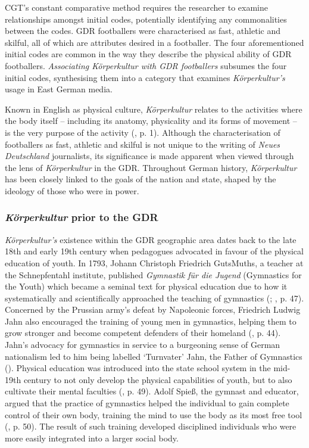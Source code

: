 CGT’s constant comparative method requires the researcher to examine relationships amongst initial codes, potentially identifying any commonalities between the codes. GDR footballers were characterised as fast, athletic and skilful, all of which are attributes desired in a footballer. The four aforementioned initial codes are common in the way they describe the physical ability of GDR footballers. \textit{Associating Körperkultur with GDR footballers} subsumes the four initial codes, synthesising them into a category that examines \textit{Körperkultur’s} usage in East German media.

Known in English as physical culture, \textit{Körperkultur} relates to the activities where the body itself – including its anatomy, physicality and its forms of movement – is the very purpose of the activity (\cite{hargreavesvertinsky2007}, p. 1). Although the characterisation of footballers as fast, athletic and skilful is not unique to the writing of \textit{Neues Deutschland} journalists, its significance is made apparent when viewed through the lens of \textit{Körperkultur} in the GDR. Throughout German history, \textit{Körperkultur} has been closely linked to the goals of the nation and state, shaped by the ideology of those who were in power.

\subsubsection*{\textit{Körperkultur} prior to the GDR}

\textit{Körperkultur’s} existence within the GDR geographic area dates back to the late 18th and early 19th century when pedagogues advocated in favour of the physical education of youth. In 1793, Johann Christoph Friedrich GutsMuths, a teacher at the Schnepfentahl institute, published \textit{Gymnastik für die Jugend} (Gymnastics for the Youth) which became a seminal text for physical education due to how it systematically and scientifically approached the teaching of gymnastics (\cite{naul2002}; \cite{reinhartkrüger2007}, p. 47). Concerned by the Prussian army’s defeat by Napoleonic forces, Friedrich Ludwig Jahn also encouraged the training of young men in gymnastics, helping them to grow stronger and become competent defenders of their homeland (\cite{kaimakamiskirialanisakbanidis2008}, p. 44). Jahn’s advocacy for gymnastics in service to a burgeoning sense of German nationalism led to him being labelled ‘Turnvater’ Jahn, the Father of Gymnastics (\cite{eisenberg1996}). Physical education was introduced into the state school system in the mid-19th century to not only develop the physical capabilities of youth, but to also cultivate their mental faculties (\cite{reinhartkrüger2007}, p. 49). Adolf Spieß, the gymnast and educator, argued that the practice of gymnastics helped the individual to gain complete control of their own body, training the mind to use the body as its most free tool (\cite{reinhartkrüger2007}, p. 50). The result of such training developed disciplined individuals who were more easily integrated into a larger social body.

